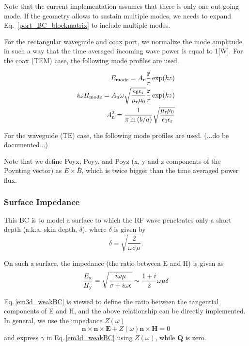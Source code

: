 \documentclass[11pt,a4paper,final]{report}
\begin{document}
Note that the current implementation assumes that there is only one out-going mode. If the geometry allows to sustain multiple modes, we needs to expand Eq.~\ref{port_BC_blockmatrix} to include multiple modes. 

For the rectangular waveguide and coax port, we normalize the mode amplitude in such a way that the time averaged  incoming wave power is equal to 1[W]. For the coax (TEM) case, the following mode profiles are used.

 \begin{align}
E_{\rm mode} = A_{\rm n} \frac{\mathbf{r}}{r} \exp(kz)
\\
i \omega H_{\rm mode} = A_{\rm n} \omega \sqrt{\frac{\epsilon_{\rm 0}\epsilon_{\rm r}}{\mu_{\rm r}\mu_{\rm 0}}} \frac{\mathbf{r}}{r} \exp(kz)
\\
 A_{\rm n}^2 = \frac{1}{\pi \ln{(b/a)}} \sqrt{\frac{\mu_{\rm r}\mu_{\rm 0}}{\epsilon_{\rm 0}\epsilon_{\rm r}}}
\end{align}

For the waveguide (TE) case, the following mode profiles are used.
(...do be documented...)

Note that we define Poyx, Poyy, and Poyz (x, y and z components of the Poynting vector) as $E \times \overline{B}$, which is twice bigger than the time averaged power flux.

 \subsubsection{Surface Impedance}
 
This BC is to model a surface to which the RF wave penetrates only a short depth (a.k.a. skin depth, $\delta$), where $\delta$ is given by 
\begin{equation} 
\delta = \sqrt{\frac{2}{\omega \sigma \mu}}.
\end{equation}

On such a surface, the impedance (the ratio between E and H) is given as
\begin{equation}
\frac{E_{\rm x}}{H_{\rm y}} = \sqrt{\frac{i \omega \mu}{\sigma + i \omega \epsilon}} \sim \frac{1+i}{2} \omega \mu \delta
\end{equation}

Eq.\,\ref{em3d_weakBC} is viewed to define  the ratio between the tangential components of E and H, and the above relationship can be directly implemented. In general, we use the impedance $Z(\omega)$ 
\begin{equation}
\mathbf{n} \times \mathbf{n} \times \mathbf{E} + Z(\omega) \mathbf{n} \times \mathbf{H} = 0
\end{equation}
 and express $\gamma$ in Eq.\,\ref{em3d_weakBC} using $Z(\omega)$, while $\mathbf{Q}$ is zero. 
 
\end{document}
